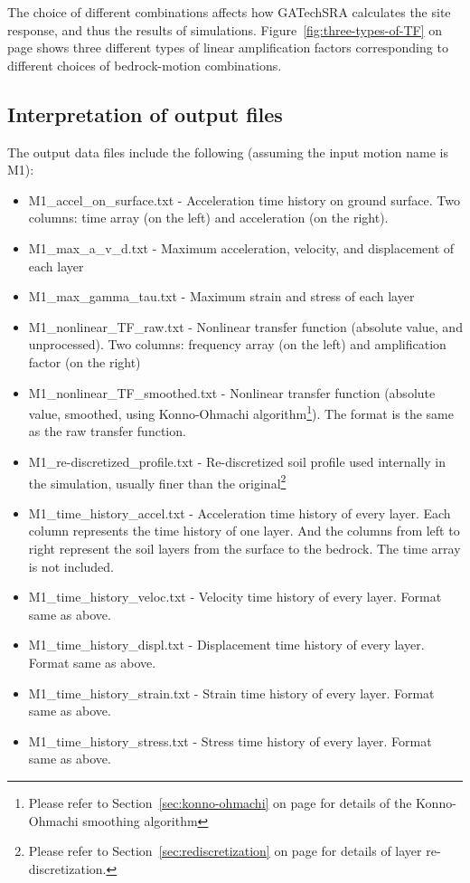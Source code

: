 \documentclass[11pt,letterpaper]{article}
\begin{document}
The choice of different combinations affects how GATechSRA calculates the site response, and thus the results of simulations. Figure~\ref{fig:three-types-of-TF} on page \pageref{fig:three-types-of-TF} shows three different types of linear amplification factors corresponding to different choices of bedrock-motion combinations.





\newpage
\subsection{Interpretation of output files}

The output data files include the following (assuming the input motion name is M1):

\begin{small}
\begin{itemize}
\item \textsf{M1\_accel\_on\_surface.txt} - Acceleration time history on ground surface. Two columns: time array (on the left) and acceleration (on the right).
\item \textsf{M1\_max\_a\_v\_d.txt} - Maximum acceleration, velocity, and displacement of each layer
\item \textsf{M1\_max\_gamma\_tau.txt} - Maximum strain and stress of each layer
\item \textsf{M1\_nonlinear\_TF\_raw.txt} - Nonlinear transfer function (absolute value, and unprocessed). Two columns: frequency array (on the left) and amplification factor (on the right)
\item \textsf{M1\_nonlinear\_TF\_smoothed.txt} - Nonlinear transfer function (absolute value, smoothed, using Konno-Ohmachi algorithm\footnote{Please refer to Section~\ref{sec:konno-ohmachi} on page \pageref{sec:konno-ohmachi} for details of the Konno-Ohmachi smoothing algorithm}). The format is the same as the raw transfer function.
\item \textsf{M1\_re-discretized\_profile.txt} - Re-discretized soil profile used internally in the simulation, usually finer than the original\footnote{Please refer to Section~\ref{sec:rediscretization} on page \pageref{sec:konno-ohmachi} for details of layer re-discretization.}
\item \textsf{M1\_time\_history\_accel.txt} - Acceleration time history of every layer. Each column represents the time history of one layer. And the columns from left to right represent the soil layers from the surface to the bedrock. The time array is not included.
\item \textsf{M1\_time\_history\_veloc.txt} - Velocity time history of every layer. Format same as above.
\item \textsf{M1\_time\_history\_displ.txt} - Displacement time history of every layer. Format same as above.
\item \textsf{M1\_time\_history\_strain.txt} - Strain time history of every layer. Format same as above.
\item \textsf{M1\_time\_history\_stress.txt} - Stress time history of every layer. Format same as above.
\end{itemize}
\end{small}
\end{document}

